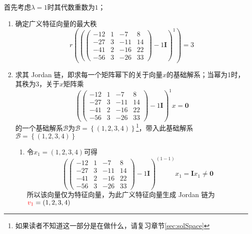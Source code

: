 \begin{example}
首先考虑$\lambda=1$时其代数重数为$1$；
\begin{enumerate}
	\item 确定广义特征向量的最大秩 $$r\left( \left( \begin{pmatrix}
 -12 & 1 & -7 & 8\\
 -27 & 3 & -11 & 14\\
 -41 & 2 & -16 & 22\\
 -56 & 3 & -26 & 33
\end{pmatrix}-1\mathbf{I} \right)^1 \right)=3$$
	\item 求其 Jordan 链，即求每一个矩阵幂下的关于向量$x$的基础解系；当幂为1时，其秩为3，关于$x$矩阵乘$$\left( \begin{pmatrix}
 -12 & 1 & -7 & 8\\
 -27 & 3 & -11 & 14\\
 -41 & 2 & -16 & 22\\
 -56 & 3 & -26 & 33
\end{pmatrix}-1\mathbf{I} \right)^1x=\boldsymbol{0}$$的一个基础解系$\mathcal{B}$为$\mathcal{B}=\left\{ (1,2,3,4) \right\}$\footnote{如果读者不知道这一部分是在做什么，请复习章节\ref{sec:solSpace}}，带入此基础解系$\mathcal{B}=\left\{ (1,2,3,4) \right\}$
	\begin{enumerate}
	\item 令$x_1=(1,2,3,4)$可得$$\left( \begin{pmatrix}
 -12 & 1 & -7 & 8\\
 -27 & 3 & -11 & 14\\
 -41 & 2 & -16 & 22\\
 -56 & 3 & -26 & 33
\end{pmatrix}-1\mathbf{I} \right)^{(1-1)}x_1=\mathbf{I}x_1\neq \boldsymbol{0}$$所以该向量仅为特征向量，为此广义特征向量生成 Jordan 链为$\textcolor{red}{v_1}=(1,2,3,4)$
	\end{enumerate}
\end{enumerate}

\vspace{1em}


\end{example}
